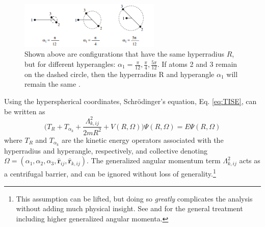 \documentclass[prl,onecolumn,amsmath,amssymb,titlepage,nofootinbib,preprint]{revtex4-1}
\begin{document}
	\begin{figure}[h]
		\includegraphics[width=0.6\textwidth]{Figures/hyperangular_example}
		\caption{Shown above are configurations that have the same hyperradius $R$, but for
			 different hyperangles: $\alpha_{1}=\frac{\pi}{12},\frac{\pi}{4},\frac{5\pi}{12}$.  If atoms 2 and 3 remain on the dashed circle, then the hyperradius R and hyperangle $\alpha_{1}$ will remain the same \cite{Braaten_2006}.}
		\label{fig:hyperang_ex}
	\end{figure}
Using the hyperspherical coordinates, Schr\"{o}dinger's equation, Eq. \ref{eq:TISE}, can be written as
	\begin{equation}\label{eq:TISE_hyp}
		\bigg(T_{R}+T_{\alpha_{k}}+\frac{\Lambda^{2}_{k,ij}}{2mR^{2}}+V(R,\Omega)\bigg)
		\Psi(R,\Omega)=E\Psi(R,\Omega)
	\end{equation}
where $T_{R}$ and $T_{\alpha_{k}}$ are the kinetic energy operators associated with the hyperradius and hyperangle, respectively, and collective denoting $\Omega=(\alpha_{1},\alpha_{2},\alpha_{3}, \mathbf{\hat{r}}_{ij},\mathbf{\hat{r}}_{k,ij})$.  The generalized angular momentum term $\Lambda^{2}_{k,ij} $ acts as a centrifugal barrier, and can be ignored without loss of generality.\footnote{This assumption can be lifted, but doing so \textit{greatly} complicates the analysis without adding much physical insight. See \cite{Gasaneo2002} and \cite{Nielsen2001} for the general treatment including higher generalized angular momenta.}
\end{document}
